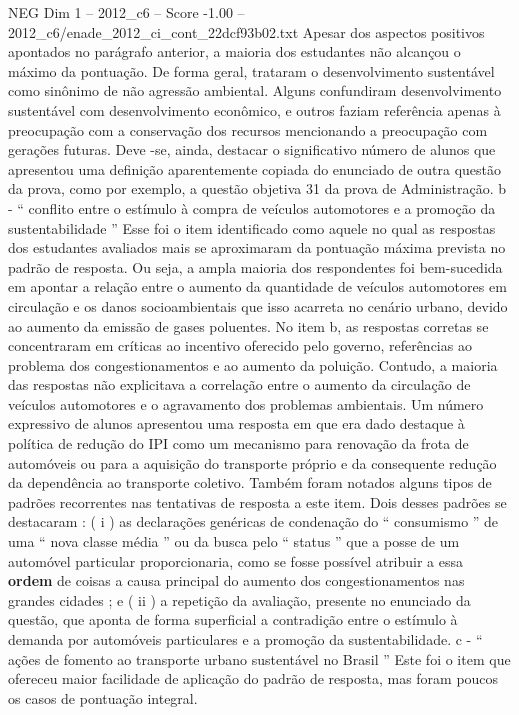 \begin{textsample}{NEG Dim 1 – 2012\_c6 – Score -1.00 – 2012\_c6/enade\_2012\_ci\_cont\_22dcf93b02.txt}
Apesar dos aspectos positivos apontados no parágrafo anterior, a maioria dos estudantes não alcançou o máximo da pontuação.
De forma geral, trataram o desenvolvimento sustentável como sinônimo de não agressão ambiental.
Alguns confundiram desenvolvimento sustentável com desenvolvimento econômico, e outros faziam referência apenas à preocupação com a conservação dos recursos mencionando a preocupação com gerações futuras.
Deve -se, ainda, destacar o significativo número de alunos que apresentou uma definição aparentemente copiada do enunciado de outra questão da prova, como por exemplo, a questão objetiva 31 da prova de Administração. b - “ conflito entre o estímulo à compra de veículos automotores e a promoção da sustentabilidade ” Esse foi o item identificado como aquele no qual as respostas dos estudantes avaliados mais se aproximaram da pontuação máxima prevista no padrão de resposta.
Ou seja, a ampla maioria dos respondentes foi bem-sucedida em apontar a relação entre o aumento da quantidade de veículos automotores em circulação e os danos socioambientais que isso acarreta no cenário urbano, devido ao aumento da emissão de gases poluentes.
No item b, as respostas corretas se concentraram em críticas ao incentivo oferecido pelo governo, referências ao problema dos congestionamentos e ao aumento da poluição.
Contudo, a maioria das respostas não explicitava a correlação entre o aumento da circulação de veículos automotores e o agravamento dos problemas ambientais.
Um número expressivo de alunos apresentou uma resposta em que era dado destaque à política de redução do IPI como um mecanismo para renovação da frota de automóveis ou para a aquisição do transporte próprio e da consequente redução da dependência ao transporte coletivo.
Também foram notados alguns tipos de padrões recorrentes nas tentativas de resposta a este item.
Dois desses padrões se destacaram : ( i ) as declarações genéricas de condenação do “ consumismo ” de uma “ nova classe média ” ou da busca pelo “ status ” que a posse de um automóvel particular proporcionaria, como se fosse possível atribuir a essa \textbf{ordem} de coisas a causa principal do aumento dos congestionamentos nas grandes cidades ; e ( ii ) a repetição da avaliação, presente no enunciado da questão, que aponta de forma superficial a contradição entre o estímulo à demanda por automóveis particulares e a promoção da sustentabilidade. c - “ ações de fomento ao transporte urbano sustentável no Brasil ” Este foi o item que ofereceu maior facilidade de aplicação do padrão de resposta, mas foram poucos os casos de pontuação integral.

\end{textsample}
